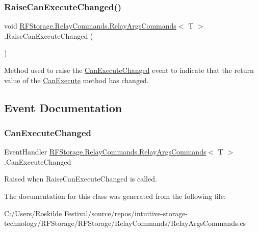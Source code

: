 \subsubsection{\texorpdfstring{RaiseCanExecuteChanged()}{RaiseCanExecuteChanged()}}
{\footnotesize\ttfamily void \mbox{\hyperlink{class_r_f_storage_1_1_relay_commands_1_1_relay_args_commands}{R\+F\+Storage.\+Relay\+Commands.\+Relay\+Args\+Commands}}$<$ T $>$.Raise\+Can\+Execute\+Changed (\begin{DoxyParamCaption}{ }\end{DoxyParamCaption})}



Method used to raise the \mbox{\hyperlink{class_r_f_storage_1_1_relay_commands_1_1_relay_args_commands_a601b27519b427e6bc1d70dbb27e30554}{Can\+Execute\+Changed}} event to indicate that the return value of the \mbox{\hyperlink{class_r_f_storage_1_1_relay_commands_1_1_relay_args_commands_a2c2ee8921125d98ddae9f72e26b9f589}{Can\+Execute}} method has changed. 



\subsection{Event Documentation}
\mbox{\label{class_r_f_storage_1_1_relay_commands_1_1_relay_args_commands_a601b27519b427e6bc1d70dbb27e30554}} 
\subsubsection{\texorpdfstring{CanExecuteChanged}{CanExecuteChanged}}
{\footnotesize\ttfamily Event\+Handler \mbox{\hyperlink{class_r_f_storage_1_1_relay_commands_1_1_relay_args_commands}{R\+F\+Storage.\+Relay\+Commands.\+Relay\+Args\+Commands}}$<$ T $>$.Can\+Execute\+Changed}



Raised when Raise\+Can\+Execute\+Changed is called. 



The documentation for this class was generated from the following file\+:\begin{DoxyCompactItemize}
\item 
C\+:/\+Users/\+Roskilde Festival/source/repos/intuitive-\/storage-\/technology/\+R\+F\+Storage/\+R\+F\+Storage/\+Relay\+Commands/Relay\+Args\+Commands.\+cs\end{DoxyCompactItemize}

